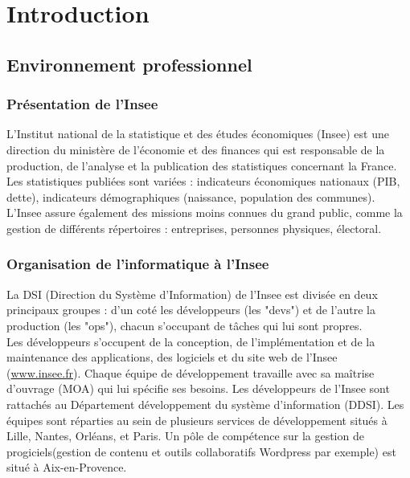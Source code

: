 \documentclass[11pt,fleqn]{book} %
\begin{document}
\pagestyle{fancy} %


\mainmatter
\part{\textcolor{ocre}{Introduction}}
\chapter{Environnement professionnel}
\vspace{-2cm}
\section{Présentation de l'Insee}
L’Institut national de la statistique et des études économiques (Insee) est une direction du ministère de l'économie et des finances qui est responsable de la production, de l'analyse et la publication des statistiques concernant la France. Les statistiques publiées sont variées : indicateurs économiques nationaux (PIB, dette), indicateurs démographiques (naissance, population des communes). L'Insee assure également des missions moins connues du grand public, comme la gestion de différents répertoires : entreprises, personnes physiques, électoral.

\section{Organisation de l'informatique à l'Insee}
La DSI (Direction du Système d'Information) de l’Insee est divisée en deux principaux groupes :  d'un coté les développeurs (les "devs") et de l'autre la production (les "ops"), chacun s'occupant de tâches qui lui sont propres.\\

Les développeurs s'occupent de la conception, de l'implémentation et de la maintenance des applications, des logiciels et du site web de l'Insee (\url{www.insee.fr}). Chaque équipe de développement travaille avec sa maîtrise d'ouvrage (MOA) qui lui spécifie ses besoins. Les développeurs de l’Insee sont rattachés au Département développement du système d’information (DDSI). Les équipes sont réparties au sein de plusieurs services de développement situés à Lille, Nantes,  Orléans, et Paris. Un pôle de compétence sur la gestion de progiciels(gestion de contenu et outils collaboratifs Wordpress par exemple) est situé à Aix-en-Provence.\\
\end{document}
